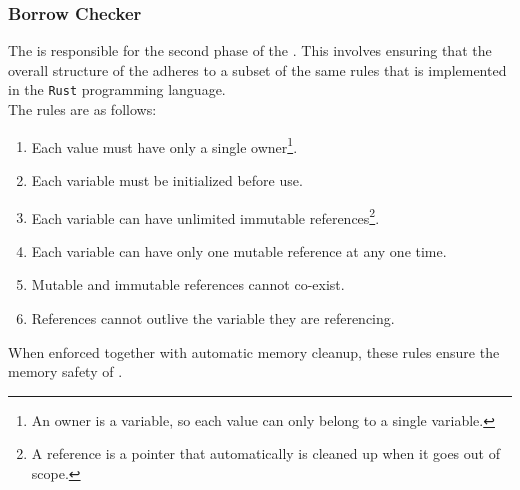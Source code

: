 \subsubsection{Borrow Checker}

The \borrowChecker{} is responsible for the second phase of the \static. This
involves ensuring that the overall structure of the \ast{} adheres to a subset of the
same rules that is implemented in the \texttt{Rust} programming language\cite{RUST}.
\\

The rules are as follows:

\begin{enumerate} 
  \item Each value must have only a single owner\footnote{An owner is a variable, so
    each value can only belong to a single variable.}. 
  
  \item Each variable must be initialized before use. 

  \item Each variable can have unlimited immutable references\footnote{A reference is
    a pointer that automatically is cleaned up when it goes out of scope.}.

  \item Each variable can have only one mutable reference at any one time. 

  \item Mutable and immutable references cannot co-exist. 

  \item References cannot outlive the variable they are referencing.
\end{enumerate}

When enforced together with automatic memory cleanup, these rules ensure the memory
safety of \lang. 
